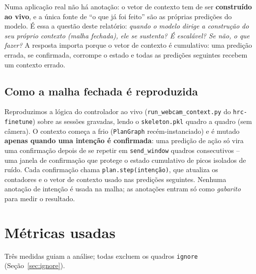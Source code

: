 \documentclass[11pt]{article}
\begin{document}
Numa aplicação real não há anotação: o vetor de contexto tem de ser
\textbf{construído ao vivo}, e a única fonte de ``o que já foi feito'' são as
próprias predições do modelo. É essa a questão deste relatório: \emph{quando o
modelo dirige a construção do seu próprio contexto (malha fechada), ele se
sustenta? É escalável? Se não, o que fazer?} A resposta importa porque o vetor
de contexto é cumulativo: uma predição errada, se confirmada, corrompe o estado
e todas as predições seguintes recebem um contexto errado.

\subsection{Como a malha fechada é reproduzida}
\label{sec:malha}

Reproduzimos a lógica do controlador ao vivo (\texttt{run\_webcam\_context.py}
do \texttt{hrc-finetune}) sobre as sessões gravadas, lendo o \texttt{skeleton.pkl}
quadro a quadro (sem câmera). O contexto começa a frio (\texttt{PlanGraph}
recém-instanciado) e é mutado \textbf{apenas quando uma intenção é confirmada}:
uma predição de ação só vira uma confirmação depois de se repetir em
\texttt{send\_window} quadros consecutivos -- uma janela de confirmação que
protege o estado cumulativo de picos isolados de ruído. Cada confirmação chama
\texttt{plan.step(intenção)}, que atualiza os contadores e o vetor de contexto
usado nas predições seguintes. Nenhuma anotação de intenção é usada na malha; as
anotações entram só como \emph{gabarito} para medir o resultado.

\section{Métricas usadas}
\label{sec:metricas}

Três medidas guiam a análise; todas excluem os quadros \texttt{ignore}
(Seção~\ref{sec:ignore}).
\end{document}
